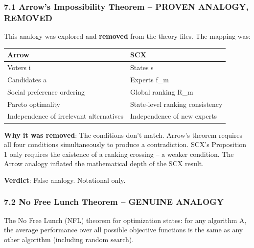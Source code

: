 \documentclass[
  12pt,
]{ctexart}
\begin{document}
\subsubsection{7.1 Arrow's Impossibility Theorem -- PROVEN ANALOGY,
REMOVED}\label{arrows-impossibility-theorem-proven-analogy-removed}

This analogy was explored and \textbf{removed} from the theory files.
The mapping was:

\begin{longtable}[]{@{}
  >{\raggedright\arraybackslash}p{}
  >{\raggedright\arraybackslash}p{}@{}}
\toprule\noalign{}
\begin{minipage}[b]{\linewidth}\raggedright
Arrow
\end{minipage} & \begin{minipage}[b]{\linewidth}\raggedright
SCX
\end{minipage} \\
\midrule\noalign{}
\endhead
\bottomrule\noalign{}
\endlastfoot
Voters i & States s \\
Candidates a & Experts f\_m \\
Social preference ordering & Global ranking R\_m \\
Pareto optimality & State-level ranking consistency \\
Independence of irrelevant alternatives & Independence of new experts \\
\end{longtable}

\textbf{Why it was removed}: The conditions don't match. Arrow's theorem
requires all four conditions simultaneously to produce a contradiction.
SCX's Proposition 1 only requires the existence of a ranking crossing --
a weaker condition. The Arrow analogy inflated the mathematical depth of
the SCX result.

\textbf{Verdict}: False analogy. Notational only.

\subsubsection{7.2 No Free Lunch Theorem -- GENUINE
ANALOGY}\label{no-free-lunch-theorem-genuine-analogy}

The No Free Lunch (NFL) theorem for optimization states: for any
algorithm A, the average performance over all possible objective
functions is the same as any other algorithm (including random search).
\end{document}
